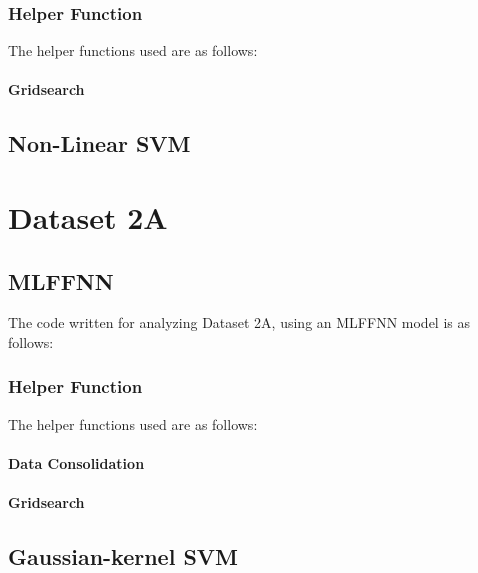 \documentclass[11pt,a4paper]{article}
\begin{document}
\subsubsection{Helper Function}
The helper functions used are as follows:\vspace{-1em}
\paragraph{Gridsearch}


\subsection{Non-Linear SVM}

\section{Dataset 2A}
\subsection{MLFFNN}
The code written for analyzing Dataset 2A, using an MLFFNN model is as follows:\vspace{-1em}


\subsubsection{Helper Function}
The helper functions used are as follows:\vspace{-1em}
\paragraph{Data Consolidation}

\paragraph{Gridsearch}



\subsection{Gaussian-kernel SVM}
\end{document}
